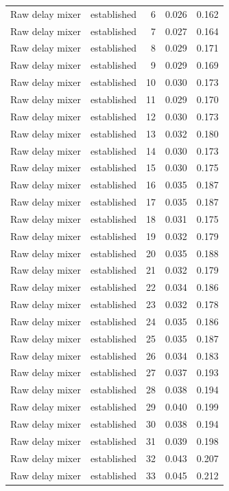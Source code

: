 \begin{tabular}{llrrr}
Raw delay mixer & established & 6 & 0.026 & 0.162 \\
Raw delay mixer & established & 7 & 0.027 & 0.164 \\
Raw delay mixer & established & 8 & 0.029 & 0.171 \\
Raw delay mixer & established & 9 & 0.029 & 0.169 \\
Raw delay mixer & established & 10 & 0.030 & 0.173 \\
Raw delay mixer & established & 11 & 0.029 & 0.170 \\
Raw delay mixer & established & 12 & 0.030 & 0.173 \\
Raw delay mixer & established & 13 & 0.032 & 0.180 \\
Raw delay mixer & established & 14 & 0.030 & 0.173 \\
Raw delay mixer & established & 15 & 0.030 & 0.175 \\
Raw delay mixer & established & 16 & 0.035 & 0.187 \\
Raw delay mixer & established & 17 & 0.035 & 0.187 \\
Raw delay mixer & established & 18 & 0.031 & 0.175 \\
Raw delay mixer & established & 19 & 0.032 & 0.179 \\
Raw delay mixer & established & 20 & 0.035 & 0.188 \\
Raw delay mixer & established & 21 & 0.032 & 0.179 \\
Raw delay mixer & established & 22 & 0.034 & 0.186 \\
Raw delay mixer & established & 23 & 0.032 & 0.178 \\
Raw delay mixer & established & 24 & 0.035 & 0.186 \\
Raw delay mixer & established & 25 & 0.035 & 0.187 \\
Raw delay mixer & established & 26 & 0.034 & 0.183 \\
Raw delay mixer & established & 27 & 0.037 & 0.193 \\
Raw delay mixer & established & 28 & 0.038 & 0.194 \\
Raw delay mixer & established & 29 & 0.040 & 0.199 \\
Raw delay mixer & established & 30 & 0.038 & 0.194 \\
Raw delay mixer & established & 31 & 0.039 & 0.198 \\
Raw delay mixer & established & 32 & 0.043 & 0.207 \\
Raw delay mixer & established & 33 & 0.045 & 0.212 \\

\end{tabular}
